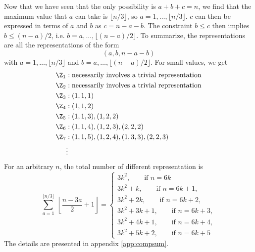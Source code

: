 \documentclass{worksheetclass}
\begin{document}
            Now that we have seen that the only possibility is $a+b+c=n$, we find that the maximum value that $a$ can take is $\lfloor n/3\rfloor$, so $a=1,\dots,\lfloor n/3\rfloor$. $c$ can then be expressed in terms of $a$ and $b$ as $c=n-a-b$. The constraint $b\leq c$ then implies $b\leq (n-a)/2$, i.e. $b=a,\dots,\lfloor (n-a)/2\rfloor$. To summarize, the representations are all the representations of the form
            \begin{equation}
                (a,b,n-a-b)
            \end{equation}
            with $a=1,\dots,\lfloor n/3\rfloor$ and $b=a,\dots,\lfloor (n-a)/2\rfloor$. For small values, we get
            \begin{align*}
                \Z_1 &: \text{necessarily involves a trivial representation}\\
                \Z_2 &: \text{necessarily involves a trivial representation}\\
                \Z_3 &: (1,1,1)\\
                \Z_4 &: (1,1,2)\\
                \Z_5 &: (1,1,3),(1,2,2)\label{reprZ5C3}\\
                \Z_6 &: (1,1,4),(1,2,3),(2,2,2)\\
                \Z_7 &: (1,1,5),(1,2,4),(1,3,3),(2,2,3)\\
                &\vdots
            \end{align*}
            For an arbitrary $n$, the total number of different representation is
            \begin{equation}
                \sum^{\lfloor n/3\rfloor}_{a=1}~\left\lfloor \frac{n-3a}{2}+1\right\rfloor = \begin{cases}
                    3k^2,\qquad\text{if $n=6k$}\\
                    3k^2+k,\qquad\text{if $n=6k+1$},\\
                    3k^2+2k,\qquad\text{if $n=6k+2$},\\
                    3k^2+3k+1,\qquad\text{if $n=6k+3$},\\
                    3k^2+4k+1,\qquad\text{if $n=6k+4$},\\
                    3k^2+5k+2,\qquad\text{if $n=6k+5$}
                \end{cases}
            \end{equation}
            The details are presented in appendix \ref{app:compsum}.
\end{document}
